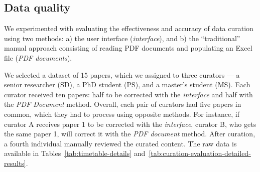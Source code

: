 \subsection{Data quality}
\label{sec:interface-evaluation}
We experimented with evaluating the effectiveness and accuracy of data curation using two methods: a) the user interface (\textit{interface}), and b) the ``traditional'' manual approach consisting of reading PDF documents and populating an Excel file (\textit{PDF documents}).

We selected a dataset of 15 papers, which we assigned to three curators — a senior researcher (SD), a PhD student (PS), and a master's student (MS). 
Each curator received ten papers: half to be corrected with the \textit{interface} and half with the \textit{PDF Document} method. 
Overall, each pair of curators had five papers in common, which they had to process using opposite methods.
For instance, if curator A receives paper 1 to be corrected with the \textit{interface}, curator B, who gets the same paper 1, will correct it with the \textit{PDF document} method.
After curation, a fourth individual manually reviewed the curated content. The raw data is available in Tables~\ref{tab:timetable-details} and~\ref{tab:curation-evaluation-detailed-results}.

